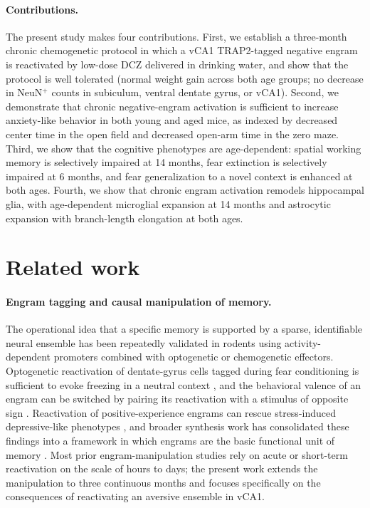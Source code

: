 \documentclass[11pt]{article}
\begin{document}
\paragraph{Contributions.} The present study makes four contributions. First, we establish a three-month chronic chemogenetic protocol in which a vCA1 TRAP2-tagged negative engram is reactivated by low-dose DCZ delivered in drinking water, and show that the protocol is well tolerated (normal weight gain across both age groups; no decrease in NeuN$^{+}$ counts in subiculum, ventral dentate gyrus, or vCA1). Second, we demonstrate that chronic negative-engram activation is sufficient to increase anxiety-like behavior in both young and aged mice, as indexed by decreased center time in the open field and decreased open-arm time in the zero maze. Third, we show that the cognitive phenotypes are age-dependent: spatial working memory is selectively impaired at 14 months, fear extinction is selectively impaired at 6 months, and fear generalization to a novel context is enhanced at both ages. Fourth, we show that chronic engram activation remodels hippocampal glia, with age-dependent microglial expansion at 14 months and astrocytic expansion with branch-length elongation at both ages.

\section{Related work}

\paragraph{Engram tagging and causal manipulation of memory.}
The operational idea that a specific memory is supported by a sparse, identifiable neural ensemble has been repeatedly validated in rodents using activity-dependent promoters combined with optogenetic or chemogenetic effectors. Optogenetic reactivation of dentate-gyrus cells tagged during fear conditioning is sufficient to evoke freezing in a neutral context \citep{liu2012engram}, and the behavioral valence of an engram can be switched by pairing its reactivation with a stimulus of opposite sign \citep{redondo2014valence}. Reactivation of positive-experience engrams can rescue stress-induced depressive-like phenotypes \citep{ramirez2015positive}, and broader synthesis work has consolidated these findings into a framework in which engrams are the basic functional unit of memory \citep{josselyn2020engram}. Most prior engram-manipulation studies rely on acute or short-term reactivation on the scale of hours to days; the present work extends the manipulation to three continuous months and focuses specifically on the consequences of reactivating an aversive ensemble in vCA1.
\end{document}
